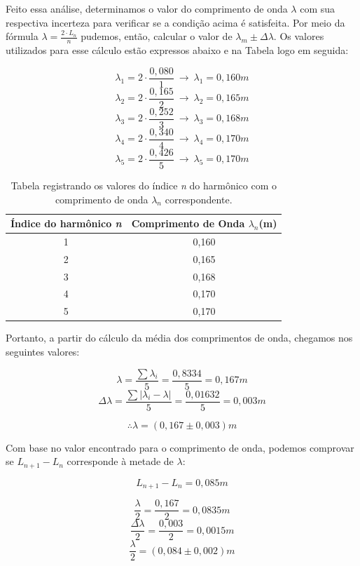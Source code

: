 Feito essa análise, determinamos o valor do comprimento de onda $\lambda$ com sua respectiva incerteza para verificar se a condição acima é satisfeita. Por meio da fórmula $\lambda = \frac{2 \cdot L_n}{n}$  pudemos, então, calcular o valor de $\lambda_m \pm \Delta\lambda$. Os valores utilizados para esse cálculo estão expressos abaixo e na Tabela logo em seguida:

\[ \lambda_1 = 2 \cdot \frac{0,080}{1} \ \to \ \lambda _1 = 0,160 m  \]
\[ \lambda_2 = 2 \cdot \frac{0,165}{2} \ \to \ \lambda _2 = 0,165 m  \]
\[ \lambda_3 = 2 \cdot \frac{0,252}{3} \ \to \ \lambda _3 = 0,168 m  \]
\[ \lambda_4 = 2 \cdot \frac{0,340}{4} \ \to \ \lambda _4 = 0,170 m  \]
\[ \lambda_5 = 2 \cdot \frac{0,426}{5} \ \to \ \lambda _5 = 0,170 m  \]

\begin{table}[H]
    \centering
    \begin{tabular}{ |c||c| }
        \hline
        \textbf{Índice do harmônico \textit{n}} & \textbf{Comprimento de Onda \textit{$\lambda_n$}(m)}\\
        \hline 
         1&	0,160 \\
         
         2&	0,165 \\
         
         3&	0,168 \\
         
         4&	0,170 \\
         
         5&	0,170 \\
        \hline
    \end{tabular}
    \caption{Tabela registrando os valores do índice \textit{n} do harmônico com o comprimento de onda $\lambda_n$ correspondente.}
\end{table}

Portanto, a partir do cálculo da média dos comprimentos de onda, chegamos nos seguintes valores:

\[ \lambda = \frac{\sum \lambda_i}{5} = \frac{0,8334}{5} = 0,167 m\] 
\[ \Delta\lambda = \frac{\sum |\lambda_i - \lambda|}{5} = \frac{0,01632}{5} = 0,003 m\] 

\[ \therefore \lambda = (0,167 \pm 0,003)m\] 

Com base no valor encontrado para o comprimento de onda, podemos comprovar se $L_{n+1} - L_n$ corresponde à metade de $\lambda$:

\[ L_{n+1} - L_n = 0,085 m\]

\[ \frac{\lambda}{2} = \frac{0,167}{2} = 0,0835 m\]
\[ \frac{\Delta\lambda}{2} = \frac{0,003}{2} = 0,0015 m\]
\[ \frac{\lambda}{2} = (0,084 \pm 0,002) m\]

